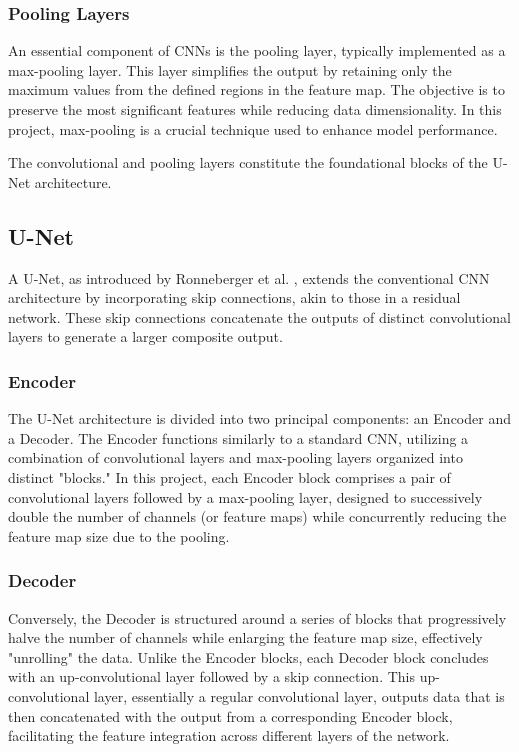\documentclass[12pt]{article}
\begin{document}
\subsubsection*{Pooling Layers}

An essential component of CNNs is the pooling layer, typically implemented as a max-pooling layer. This layer simplifies the output by retaining only the maximum values from the defined regions in the feature map. The objective is to preserve the most significant features while reducing data dimensionality. In this project, max-pooling is a crucial technique used to enhance model performance.

The convolutional and pooling layers constitute the foundational blocks of the U-Net architecture.

\subsection{U-Net}



A U-Net, as introduced by Ronneberger et al. \cite{ronneberger2015unet}, extends the conventional CNN architecture by incorporating skip connections, akin to those in a residual network. These skip connections concatenate the outputs of distinct convolutional layers to generate a larger composite output.

\subsubsection*{Encoder}

The U-Net architecture is divided into two principal components: an Encoder and a Decoder. The Encoder functions similarly to a standard CNN, utilizing a combination of convolutional layers and max-pooling layers organized into distinct "blocks." In this project, each Encoder block comprises a pair of convolutional layers followed by a max-pooling layer, designed to successively double the number of channels (or feature maps) while concurrently reducing the feature map size due to the pooling.

\subsubsection*{Decoder}

Conversely, the Decoder is structured around a series of blocks that progressively halve the number of channels while enlarging the feature map size, effectively "unrolling" the data. Unlike the Encoder blocks, each Decoder block concludes with an up-convolutional layer followed by a skip connection. This up-convolutional layer, essentially a regular convolutional layer, outputs data that is then concatenated with the output from a corresponding Encoder block, facilitating the feature integration across different layers of the network.
\end{document}
